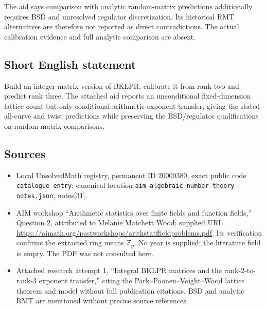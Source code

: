 \documentclass[11pt]{article}
\newcommand{\Z}{\mathbb{Z}}
\begin{document}
The aid says comparison with analytic random-matrix predictions additionally requires BSD and unresolved regulator discretization. Its historical RMT alternatives are therefore not reported as direct contradictions. The actual calibration evidence and full analytic comparison are absent.
\subsection{Short English statement}
Build an integer-matrix version of BKLPR, calibrate it from rank two and predict rank three. The attached aid reports an unconditional fixed-dimension lattice count but only conditional arithmetic exponent transfer, giving the stated all-curve and twist predictions while preserving the BSD/regulator qualifications on random-matrix comparisons.
\subsection{Sources}
\begin{itemize}
\item Local UnsolvedMath registry, permanent ID \(20000380\), exact public code \texttt{catalogue entry}; canonical location \texttt{aim-algebraic-number-theory-notes.json}, notes[31].
\item AIM workshop ``Arithmetic statistics over finite fields and function fields,'' Question 2, attributed to Melanie Matchett Wood; supplied URL \url{https://aimath.org/pastworkshops/arithstatffieldproblems.pdf}. Its verification confirms the extracted ring means \(\Z_p\). No year is supplied; the literature field is empty. The PDF was not consulted here.
\item Attached research attempt 1, ``Integral BKLPR matrices and the rank-2-to-rank-3 exponent transfer,'' citing the Park--Poonen--Voight--Wood lattice theorem and model without full publication citations. BSD and analytic RMT are mentioned without precise source references.
\end{itemize}
\end{document}
